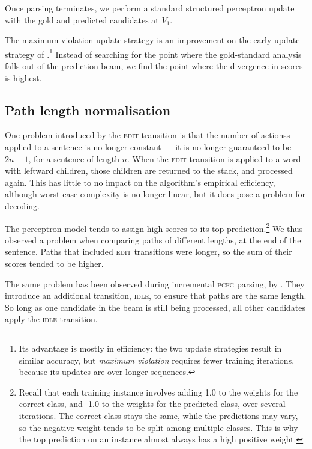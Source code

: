 \documentclass[11pt,letterpaper]{article}
\begin{document}
Once parsing terminates, we perform a standard structured perceptron update
with the gold and predicted candidates at $V_1$.

The maximum violation update strategy is an improvement on the early update
strategy of \citet{collins:02}.\footnote{Its advantage is mostly in efficiency:
the two update strategies result in similar accuracy, but \emph{maximum violation}
requires fewer training iterations, because its updates are over longer sequences.}
Instead of searching for the point where the
gold-standard analysis falls out of the prediction beam, we find the point
where the divergence in scores is highest.



\subsection{Path length normalisation}

One problem introduced by the \textsc{edit} transition is that the number of
actionss applied to a sentence is no longer constant --- it is no longer guaranteed
to be $2n-1$, for a sentence of length $n$. When the \textsc{edit} transition is
applied to a word with leftward children, those children are returned to the stack,
and processed again.  This has little to no impact on the algorithm's empirical
efficiency, although worst-case complexity is no longer linear, but it does
pose a problem for decoding.

The perceptron model tends to assign
high scores to its top prediction.\footnote{Recall that each training instance
involves adding 1.0 to the weights for the correct class, and -1.0 to the weights
for the predicted class, over several iterations. The correct class stays the
same, while the predictions may vary, so the negative weight tends to be split
among multiple classes. This is why the top prediction on an instance almost
always has a high positive weight.}
We thus observed a problem when comparing paths of different lengths, at the end
of the sentence. Paths that included \textsc{edit} transitions were longer,
so the sum of their scores tended to be higher.

The same problem has been observed during incremental \textsc{pcfg} parsing,
by \citet{zhang:13}.  They introduce an additional transition, \textsc{idle},
to ensure that paths are the same length. So long as one candidate in the beam
is still being processed, all other candidates apply the \textsc{idle} transition.
\end{document}
